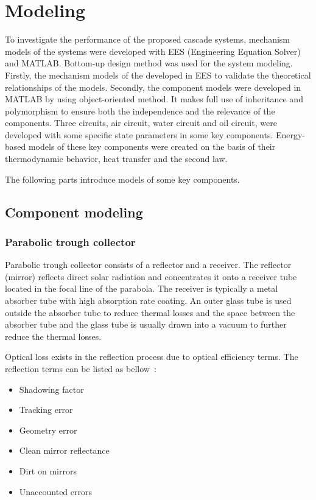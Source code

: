 \chapter{Modeling}

To investigate the performance of the proposed cascade systems, mechanism models of the systems were developed with EES (Engineering Equation Solver) and MATLAB. Bottom-up design method was used for the system modeling. Firstly, the mechanism models of the developed in EES to validate the theoretical relationships of the models. Secondly, the component models were developed in MATLAB by using object-oriented method. It makes full use of inheritance and polymorphism to ensure both the independence and the relevance of the components.
Three circuits, air circuit, water circuit and oil circuit, were developed with some specific state parameters in some key components. Energy-based models of these key components were created on the basis of their thermodynamic behavior, heat transfer and the second law.

The following parts introduce models of some key components.
\section{Component modeling}
\subsection{Parabolic trough collector}


Parabolic trough collector consists of a reflector and a receiver. The reflector (mirror) reflects direct solar radiation and concentrates it onto a receiver tube located in the focal line of the parabola. The receiver is typically a metal absorber tube with high absorption rate coating. An outer glass tube is used outside the absorber tube to reduce thermal losses and the space between the absorber tube and the glass tube is usually drawn into a vacuum to further reduce the thermal losses.

Optical loss exists in the reflection process due to optical efficiency terms. The reflection terms can be listed as bellow~\cite{Price2002}:

\begin{itemize}
  \item Shadowing factor
  \item Tracking error
  \item Geometry error
  \item Clean mirror reflectance
  \item Dirt on mirrors
  \item Unaccounted errors
\end{itemize}

